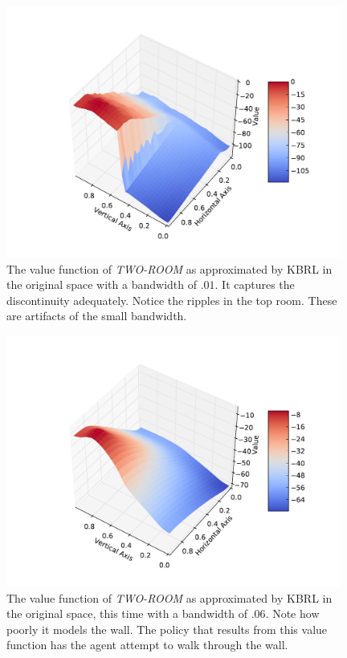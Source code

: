 \begin{figure}[!!!ht]
  \centering
    \includegraphics[width=110mm]{figs/true2rmvf.pdf}
  \caption[\textit{TWO-ROOM} value function learned using small bandwidth]
  {The value function of \textit{TWO-ROOM} as approximated by
  KBRL in the original space with a bandwidth of $.01$. It captures the
  discontinuity adequately. Notice the ripples in the top room. These are
  artifacts of the small bandwidth.}
  \label{fig:og2rm}
\end{figure}

\begin{figure}[!!!ht]
  \centering
    \includegraphics[width=110mm]{figs/blur2rmvf.pdf}
  \caption[\textit{TWO-ROOM} value function learned using large bandwidth]
  {The value function of \textit{TWO-ROOM} as approximated by
  KBRL in the original space, this time with a bandwidth of $.06$.
  Note how poorly it models the wall.
  The policy that results from this value function
  has the agent attempt to walk through the wall.}
  \label{fig:bl2rm}
\end{figure}


